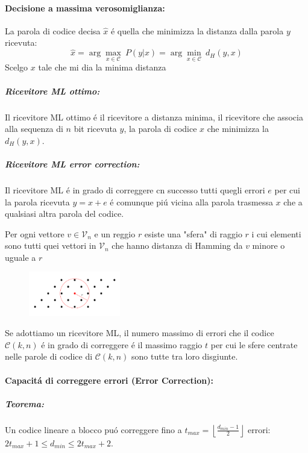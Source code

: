             \paragraph{Decisione a massima verosomiglianza:}\label{Decisione a massima verosomiglianza}
                La parola di codice decisa $\hat{x}$ é quella che minimizza la distanza dalla parola $y$ ricevuta:
                \[
                    \hat{x} = \arg \underset{x\in\mathcal{C}}{\max}\ P(y|x) = \arg \underset{x\in\mathcal{C}}{\min}\ d_H(y,x)
                \]
                Scelgo $x$ tale che mi dia la minima distanza
                \subparagraph{Ricevitore ML ottimo:} Il ricevitore ML ottimo é il ricevitore a distanza minima, il ricevitore
                che associa alla sequenza di $n$ bit ricevuta $y$, la parola di codice $x$ che minimizza la $d_H(y,x)$.
                \subparagraph{Ricevitore ML error correction:} Il ricevitore ML é in grado di correggere cn successo tutti quegli errori
                $e$ per cui la parola ricevuta $y = x+e$ é comunque piú vicina alla parola trasmessa $x$ che a qualsiasi altra parola del codice.
                
                Per ogni vettore $v\in\mathcal{V}_n$ e un reggio $r$ esiste una "sfera" di raggio $r$ i cui elementi sono tutti quei vettori in $\mathcal{V}_n$ che hanno
                distanza di Hamming da $v$ minore o uguale a $r$

                \begin{figure}[H]
                    \centering 
                    \includegraphics[width = 4cm]{media/sfera di amming.png}
                \label{sfera di Hamming}
                \end{figure}
                Se adottiamo un ricevitore ML, il numero massimo di errori che il codice $\mathcal{C}(k,n)$ é in grado di correggere é il massimo raggio $t$ per cui le sfere centrate nelle 
                parole di codice di $\mathcal{C}(k,n)$ sono tutte tra loro disgiunte.
            \paragraph{Capacitá di correggere errori (Error Correction):}
                \subparagraph{Teorema:}\begin{sloppypar}
                   Un codice lineare a blocco puó correggere fino a ${t_{max} = \left\lfloor \frac{d_{min}-1}{2} \right\rfloor}$ errori: $2t_{max}+1 \leq d_{min} \leq 2t_{max}+2$.
                \end{sloppypar}
                    
